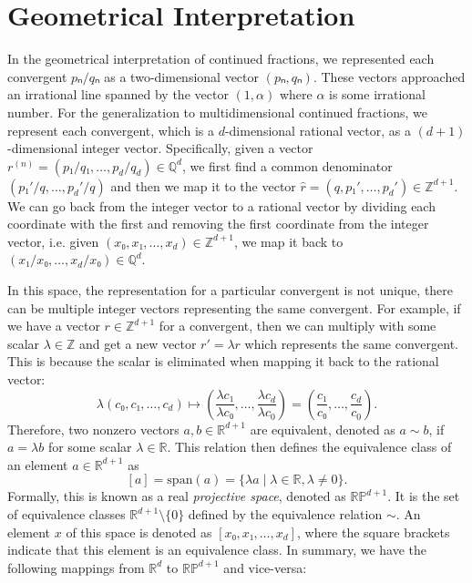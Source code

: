 \section{Geometrical Interpretation}
\label{sec:mdcf-geometry}

In the geometrical interpretation of continued fractions,
we represented each convergent $pₙ/qₙ$ as a two-dimensional vector $(pₙ, qₙ)$.
These vectors approached an irrational line spanned by the vector $(1, α)$
where $α$ is some irrational number.
For the generalization to multidimensional continued fractions,
we represent each convergent,
which is a $d$-dimensional rational vector,
as a $(d+1)$-dimensional integer vector.
Specifically, given a vector $r^{(n)} = (p₁/q₁, …, p_d/q_d) ∈ ℚ^d$,
we first find a common denominator $(p₁'/q, …, p_d'/q)$ and
then we map it to the vector $\hat r = (q, p₁', …, p_d') ∈ ℤ^{d+1}$.
We can go back from the integer vector to a rational vector
by dividing each coordinate with the first and
removing the first coordinate from the integer vector,
i.e. given $(x₀, x₁, …, x_d) ∈ ℤ^{d+1}$, we map it back to $(x₁/x₀, …, x_d/x₀) ∈ ℚ^d$.

In this space, the representation for a particular convergent is not unique,
there can be multiple integer vectors representing the same convergent.
For example, if we have a vector $r ∈ ℤ^{d+1}$ for a convergent,
then we can multiply with some scalar $λ ∈ ℤ$ and get a new vector $r' = λ r$
which represents the same convergent.
This is because the scalar is eliminated when mapping it back to the rational vector:
\[
  λ (c₀, c₁, …, c_d)
  ↦ \left(\frac{λ c₁}{λ c₀}, …, \frac{λ c_d}{λ c_0} \right)
  = \left(\frac{c₁}{c₀}, …, \frac{c_d}{c_0} \right).
\]
Therefore, two nonzero vectors $a, b ∈ ℝ^{d+1}$ are equivalent,
denoted as $a \sim b$, if $a = λ b$ for some scalar $λ ∈ ℝ$.
This relation then defines the equivalence class of an element $a ∈ ℝ^{d+1}$ as
\[
  [a] = \mathrm{span}(a) = \{ λ a \mid λ ∈ ℝ, λ ≠ 0 \}.
\]
Formally, this is known as a real \emph{projective space}, denoted as $\mathbb{RP}^{d+1}$.
It is the set of equivalence classes $ℝ^{d+1} \setminus \{0\}$ defined by the
equivalence relation $\sim$.
An element $x$ of this space is denoted as $[x₀, x₁, …, x_d]$,
where the square brackets indicate that this element is an equivalence
class.
In summary, we have the following mappings from $ℝ^d$ to $\mathbb{RP}^{d+1}$
and vice-versa:

